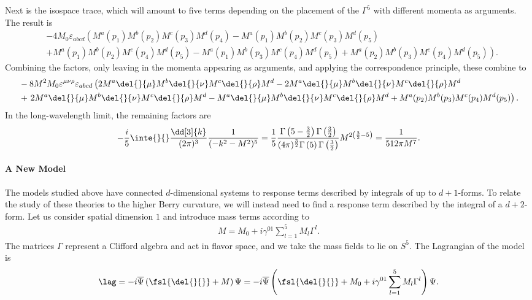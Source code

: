Next is the isospace trace, which will amount to five terms depending on the placement of the $\Gamma^{5}$ with different momenta as arguments. The result is
\begin{align*}
	&-4M_{0}\varepsilon_{abcd}\left(M^{a}(p_{1})M^{b}(p_{2})M^{c}(p_{3})M^{d}(p_{4}) - M^{a}(p_{1})M^{b}(p_{2})M^{c}(p_{3})M^{d}(p_{5}) \right. \\
	&+ M^{a}(p_{1})M^{b}(p_{2})M^{c}(p_{4})M^{d}(p_{5})- \left. M^{a}(p_{1})M^{b}(p_{3})M^{c}(p_{4})M^{d}(p_{5}) + M^{a}(p_{2})M^{b}(p_{3})M^{c}(p_{4})M^{d}(p_{5})\right).
\end{align*}
Combining the factors, only leaving in the momenta appearing as arguments, and applying the correspondence principle, these combine to
\begin{align*}
	&-8M^{2}M_{0}\varepsilon^{\mu\nu\rho}\varepsilon_{abcd}\left(2M^{a}\del{}{\mu}M^{b}\del{}{\nu}M^{c}\del{}{\rho}M^{d} - 2M^{a}\del{}{\mu}M^{b}\del{}{\nu}M^{c}\del{}{\rho}M^{d} \right. \\
	&+ \left. 2M^{a}\del{}{\mu}M^{b}\del{}{\nu}M^{c}\del{}{\rho}M^{d} - M^{a}\del{}{\mu}M^{b}\del{}{\nu}M^{c}\del{}{\rho}M^{d} + M^{a}(p_{2})M^{b}(p_{3})M^{c}(p_{4})M^{d}(p_{5})\right).
\end{align*}
In the long-wavelength limit, the remaining factors are
\begin{align*}
	-\frac{i}{5}\inte{}{}\frac{\dd[3]{k}}{(2\pi)^{3}}\frac{1}{(-k^{2} - M^{2})^{5}} = \frac{1}{5}\frac{\Gamma\left(5 - \frac{3}{2}\right)\Gamma\left(\frac{3}{2}\right)}{(4\pi)^{\frac{3}{2}}\Gamma\left(5\right)\Gamma\left(\frac{3}{2}\right)}M^{2\left(\frac{3}{2} - 5\right)} = \frac{1}{512\pi M^{7}}.
\end{align*}

\paragraph{A New Model}
The models studied above have connected $d$-dimensional systems to response terms described by integrals of up to $d + 1$-forms. To relate the study of these theories to the higher Berry curvature, we will instead need to find a response term described by the integral of a $d + 2$-form. Let us consider spatial dimension $1$ and introduce mass terms according to
\begin{align*}
	M = M_{0} + i\gamma^{01}\sum\limits_{l = 1}^{5}M_{l}\Gamma^{l}.
\end{align*}
The matrices $\Gamma$ represent a Clifford algebra and act in flavor space, and we take the mass fields to lie on $S^{5}$. The Lagrangian of the model is
\begin{align*}
	\lag = -i\overline{\Psi}\left(\fsl{\del{}{}} + M\right)\Psi = -i\overline{\Psi}\left(\fsl{\del{}{}} + M_{0} + i\gamma^{01}\sum\limits_{l = 1}^{5}M_{l}\Gamma^{l}\right)\Psi.
\end{align*}

